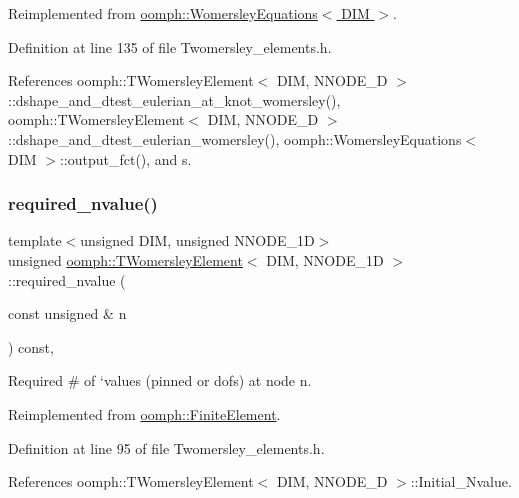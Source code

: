 Reimplemented from \hyperlink{classoomph_1_1WomersleyEquations_ab1468b769eeb97f0a603526531e01564}{oomph\+::\+Womersley\+Equations$<$ D\+I\+M $>$}.



Definition at line 135 of file Twomersley\+\_\+elements.\+h.



References oomph\+::\+T\+Womersley\+Element$<$ D\+I\+M, N\+N\+O\+D\+E\+\_\+D $>$\+::dshape\+\_\+and\+\_\+dtest\+\_\+eulerian\+\_\+at\+\_\+knot\+\_\+womersley(), oomph\+::\+T\+Womersley\+Element$<$ D\+I\+M, N\+N\+O\+D\+E\+\_\+D $>$\+::dshape\+\_\+and\+\_\+dtest\+\_\+eulerian\+\_\+womersley(), oomph\+::\+Womersley\+Equations$<$ D\+I\+M $>$\+::output\+\_\+fct(), and s.

\mbox{\label{classoomph_1_1TWomersleyElement_a2ba850b7e9fc70b8100b50dfaceb3e30}} 
\subsubsection{\texorpdfstring{required\+\_\+nvalue()}{required\_nvalue()}}
{\footnotesize\ttfamily template$<$unsigned D\+IM, unsigned N\+N\+O\+D\+E\+\_\+1D$>$ \\
unsigned \hyperlink{classoomph_1_1TWomersleyElement}{oomph\+::\+T\+Womersley\+Element}$<$ D\+IM, N\+N\+O\+D\+E\+\_\+1D $>$\+::required\+\_\+nvalue (\begin{DoxyParamCaption}\item[{const unsigned \&}]{n }\end{DoxyParamCaption}) const\hspace{0.3cm}{\ttfamily [inline]}, {\ttfamily [virtual]}}



Required \# of `values\textquotesingle{} (pinned or dofs) at node n. 



Reimplemented from \hyperlink{classoomph_1_1FiniteElement_a56610c60d5bc2d7c27407a1455471b1a}{oomph\+::\+Finite\+Element}.



Definition at line 95 of file Twomersley\+\_\+elements.\+h.



References oomph\+::\+T\+Womersley\+Element$<$ D\+I\+M, N\+N\+O\+D\+E\+\_\+D $>$\+::\+Initial\+\_\+\+Nvalue.



